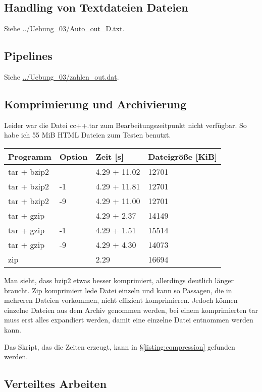 \documentclass[10pt]{article}
\begin{document}
\subsection{Handling von Textdateien Dateien}

Siehe \url{../Uebung_03/Auto_out_D.txt}.

\subsection{Pipelines}

Siehe \url{../Uebung_03/zahlen_out.dat}.

\subsection{Komprimierung und Archivierung}

Leider war die Datei cc++.tar zum Bearbeitungszeitpunkt nicht verfügbar. So habe ich 55 MiB HTML Dateien zum Testen benutzt.

\begin{tabular}{llll}
Programm & Option & Zeit [s] & Dateigröße [KiB] \\
\hline
tar + bzip2 &  & 4.29 + 11.02 & 12701 \\
tar + bzip2 & -1 & 4.29 + 11.81 & 12701 \\
tar + bzip2 & -9 & 4.29 + 11.00 & 12701 \\
tar + gzip &  & 4.29 + 2.37 & 14149 \\
tar + gzip & -1 & 4.29 + 1.51 & 15514 \\
tar + gzip & -9 & 4.29 + 4.30 & 14073 \\
zip &  & 2.29 & 16694\\
\end{tabular}

Man sieht, dass bzip2 etwas besser komprimiert, allerdings deutlich länger braucht. Zip komprimiert lede Datei einzeln und kann so Passagen, die in mehreren Dateien vorkommen, nicht effizient komprimieren. Jedoch können einzelne Dateien aus dem Archiv genommen werden, bei einem komprimierten tar muss erst alles expandiert werden, damit eine einzelne Datei entnommen werden kann.

Das Skript, das die Zeiten erzeugt, kann in §\ref{listing:compression} gefunden werden.


\subsection{Verteiltes Arbeiten}
\end{document}
